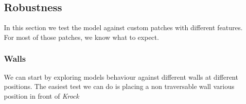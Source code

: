 \documentclass[../document.tex]{subfiles}
\begin{document}
\subsection{Robustness}
In this section we test the model against custom patches with different features. For most of those patches, we know what to expect.

\subsubsection{Walls}
We can start by exploring models behaviour against different walls at different positions. The easiest test we can do is placing a non traversable wall various position in front of \emph{Krock}
\end{document}
